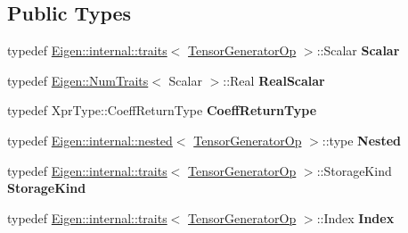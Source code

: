 \subsection*{Public Types}
\begin{DoxyCompactItemize}
\item 
\mbox{\label{class_eigen_1_1_tensor_generator_op_a308ad9438066783cc8776f9f59206752}} 
typedef \hyperlink{struct_eigen_1_1internal_1_1traits}{Eigen\+::internal\+::traits}$<$ \hyperlink{class_eigen_1_1_tensor_generator_op}{Tensor\+Generator\+Op} $>$\+::Scalar {\bfseries Scalar}
\item 
\mbox{\label{class_eigen_1_1_tensor_generator_op_a822b9443893bfa4a378a9d34adacf34a}} 
typedef \hyperlink{group___core___module_struct_eigen_1_1_num_traits}{Eigen\+::\+Num\+Traits}$<$ Scalar $>$\+::Real {\bfseries Real\+Scalar}
\item 
\mbox{\label{class_eigen_1_1_tensor_generator_op_a91201747e1d2988041b45ec75082ec7d}} 
typedef Xpr\+Type\+::\+Coeff\+Return\+Type {\bfseries Coeff\+Return\+Type}
\item 
\mbox{\label{class_eigen_1_1_tensor_generator_op_a80e0e20573c1fc49b64ad5d59ef72c8d}} 
typedef \hyperlink{struct_eigen_1_1internal_1_1nested}{Eigen\+::internal\+::nested}$<$ \hyperlink{class_eigen_1_1_tensor_generator_op}{Tensor\+Generator\+Op} $>$\+::type {\bfseries Nested}
\item 
\mbox{\label{class_eigen_1_1_tensor_generator_op_a2a24490610861d9c571ad86f1ae5cbb0}} 
typedef \hyperlink{struct_eigen_1_1internal_1_1traits}{Eigen\+::internal\+::traits}$<$ \hyperlink{class_eigen_1_1_tensor_generator_op}{Tensor\+Generator\+Op} $>$\+::Storage\+Kind {\bfseries Storage\+Kind}
\item 
\mbox{\label{class_eigen_1_1_tensor_generator_op_a95421d232cdafb894710e78ecb1a2b8a}} 
typedef \hyperlink{struct_eigen_1_1internal_1_1traits}{Eigen\+::internal\+::traits}$<$ \hyperlink{class_eigen_1_1_tensor_generator_op}{Tensor\+Generator\+Op} $>$\+::Index {\bfseries Index}
\item 
\mbox{\label{class_eigen_1_1_tensor_generator_op_a308ad9438066783cc8776f9f59206752}} 

\end{DoxyCompactItemize}
